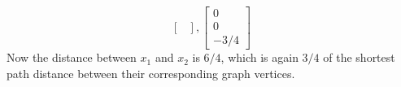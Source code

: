 \documentclass{article}
\newcommand{\1}{\mathbf{1}}
\newcommand{\0}{\mathbf{0}}
\begin{document}
\begin{enumerate}
\begin{enumerate}
\begin{equation*}
\begin{bmatrix}
          \end{bmatrix},
          \begin{bmatrix}
            0 \\ 0 \\ -3/4
          \end{bmatrix}
        \end{equation*}
        Now the distance between $x_1$ and $x_2$ is $6/4$, which is again $3/4$ of the shortest path distance between their corresponding graph vertices.
      \end{enumerate}
    \end{enumerate}

    \printbibliography

    
\end{document}
